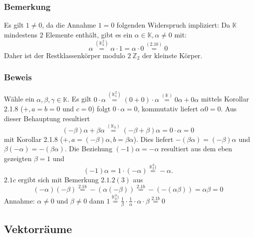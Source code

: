 \subsubsection{Bemerkung}
Es gilt $1\not=0$, da die Annahme $1=0$ folgenden Widerspruch impliziert: Da $\mathbb{K}$ mindestens $2$ Elemente enthält, gibt es ein $\alpha\in\mathbb{K}, \alpha\not= 0$ mit:
\[\alpha \stackrel{(\mathbb{K}_2^2)}{=} \alpha \cdot 1 = \alpha \cdot 0 \stackrel{(2.1b)}{=} 0\]
Daher ist der Restklassenkörper modulo $2\ \mathbb{Z}_2$ der kleinste Körper.
\subsubsection{Beweis}
Wähle ein $\alpha ,\beta ,\gamma \in\mathbb{K}$. Es gilt $0\cdot \alpha \stackrel{(\mathbb{K}_1^2)}{=} (0+0)\cdot \alpha \stackrel{(\mathbb{K})}{=} 0\alpha + 0\alpha$ mittels Korollar 2.1.8 ($+,a=b=0$ und $c=0$) folgt $0\cdot \alpha = 0$, kommutativ liefert $\alpha 0 = 0$. Aus dieser Behauptung resultiert 
\[(-\beta )\alpha +\beta\alpha \stackrel{(\mathbb{K}_3)}{=} (-\beta + \beta)\alpha = 0\cdot \alpha = 0\]
mit Korollar 2.1.8 ($+,a=(-\beta )\alpha ,b=\beta\alpha$).  Dies liefert $-(\beta\alpha )=(-\beta )\alpha$ und $\beta (-\alpha )=-(\beta\alpha )$.  Die Beziehung $(-1)\alpha = -\alpha $ resultiert aus dem eben gezeigten $\beta = 1$ und 
\[(-1)\alpha = 1\cdot (-\alpha ) \stackrel{\mathbb{K}_2^2)}{=} -\alpha .\]
$2.1c$ ergibt sich mit Bemerkung $2.1.2(3)$ aus 
\[(-\alpha ) (-\beta )\stackrel{2.1b}{=}-(\alpha (-\beta )) \stackrel{2.1b}{=} -(-(\alpha\beta )) = \alpha\beta =0 \]
Annahme: $\alpha \not=0$ und $\beta\not=0$ dann $1\stackrel{\mathbb{K}_2^3)}{=}\frac{1}{\beta} \cdot \frac{1}{\alpha} \cdot \alpha\cdot\beta \stackrel{2.1b}{=} 0$
\subsection{Vektorräume}
